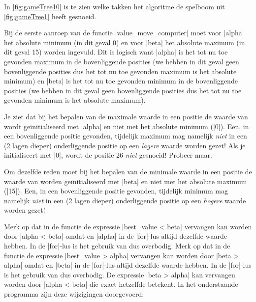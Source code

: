 \begin{cpplstShortInline}
In \cref{fig:gameTree10} is te zien welke takken het  algoritme de spelboom uit \cref{fig:gameTree1} heeft gesnoeid.


Bij de eerste aanroep van de functie |value_move_computer| moet voor |alpha| het absolute minimum (in dit geval 0) en voor |beta| het absolute maximum (in dit geval 15) worden ingevuld.
Dit is logisch want |alpha| is het tot nu toe gevonden maximum in de bovenliggende posities (we hebben in dit geval geen bovenliggende posities dus het tot nu toe gevonden maximum is het absolute minimum) en |beta| is het tot nu toe gevonden minimum in de bovenliggende posities (we hebben in dit geval geen bovenliggende posities dus het tot nu toe gevonden minimum is het absolute maximum).

Je ziet dat bij het bepalen van de maximale waarde in een positie de waarde van  wordt geïnitialiseerd met |alpha| en niet met het absolute minimum (|0|).
Een, in een bovenliggende positie gevonden, tijdelijk maximum mag namelijk \emph{niet} in een (2 lagen dieper) onderliggende positie op een \emph{lagere} waarde worden gezet!
Als je  initialiseert met |0|, wordt de positie 26 \emph{niet} gesnoeid!
Probeer maar.

Om dezelfde reden moet bij het bepalen van de minimale waarde in een positie de waarde van  worden geïnitialiseerd met |beta| en niet met het absolute maximum (|15|).
Een, in een bovenliggende positie gevonden, tijdelijk minimum mag namelijk \emph{niet} in een (2 lagen dieper) onderliggende positie op een \emph{hogere} waarde worden gezet!

Merk op dat in de functie  de expressie |best_value < beta| vervangen kan worden door |alpha < beta| omdat  en |alpha| in de |for|\hyp{}lus altijd dezelfde waarde hebben.
In de |for|\hyp{}lus is het gebruik van  dus overbodig.
Merk op dat in de functie  de expressie |best_value > alpha| vervangen kan worden door |beta > alpha| omdat  en |beta| in de |for|\hyp{}lus altijd dezelfde waarde hebben.
In de |for|\hyp{}lus is het gebruik van  dus overbodig.
De expressie |beta > alpha| kan vervangen worden door |alpha < beta| die exact hetzelfde betekent.
In het onderstaande programma  zijn deze wijzigingen doorgevoerd:


\end{cpplstShortInline}
